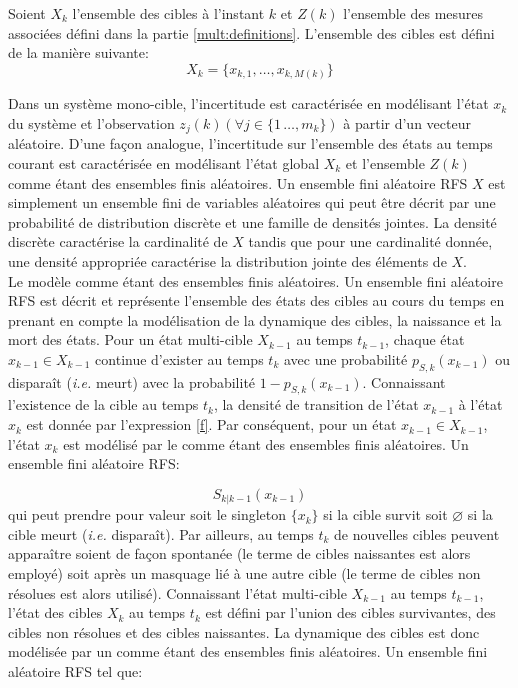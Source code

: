 \documentclass[10pt,french,a4paper]{report}
\begin{document}
Soient $X_k$ l'ensemble des cibles à l'instant $k$ et $Z(k)$ l'ensemble des mesures associées défini dans la partie \ref{mult:definitions}. L'ensemble des cibles est  défini de la manière suivante:  
\begin{equation}
 X_k= \{x_{k,1},\ldots,x_{k,M(k)}\}
\end{equation}


Dans un système mono-cible, l'incertitude est caractérisée en modélisant l'état $x_k$ du système et l'observation $z_j(k)  (\forall j \in \{1\,\ldots,m_k\})$ à partir d'un vecteur aléatoire. D'une façon analogue, l'incertitude sur l'ensemble des états au temps courant est caractérisée en modélisant l'état global $X_k$ et l'ensemble $Z(k)$ comme étant des ensembles finis aléatoires. Un ensemble fini aléatoire \ac{RFS} $X$ est simplement un ensemble fini de variables aléatoires qui peut être décrit par une probabilité de distribution discrète et une famille de densités jointes.  La densité discrète caractérise la cardinalité de $X$ tandis que pour une cardinalité donnée, une densité appropriée caractérise la distribution jointe des éléments de $X$. 
\\

Le modèle comme étant des ensembles finis aléatoires. Un ensemble fini aléatoire \ac{RFS} est décrit et représente l'ensemble des états des cibles au cours du temps en prenant en compte la modélisation de la dynamique des cibles, la naissance et la mort des états. Pour un état multi-cible $X_{k-1}$ au temps $t_{k-1}$, chaque état $x_{k-1} \in  X_{k-1}$ continue d'exister au temps $t_k$ avec une probabilité $p_{S,k}(x_{k-1})$ ou disparaît (\textit{i.e.} meurt) avec la probabilité $1-p_{S,k}(x_{k-1})$. Connaissant l'existence de la cible au temps $t_k$, la densité de transition de l'état $x_{k-1}$ à l'état $x_k$ est donnée par l'expression \ref{f}. Par conséquent, pour un état $x_{k-1} \in X_{k-1}$, l'état $x_{k}$ est modélisé par le comme étant des ensembles finis aléatoires. Un ensemble fini aléatoire \ac{RFS}:

\begin{equation}
S_{k|k-1}(x_{k-1})
\end{equation}
qui peut prendre pour valeur soit le singleton $\{x_{k}\}$ si la cible survit soit $\varnothing$ si la cible meurt (\textit{i.e.} disparaît). Par ailleurs, au temps $t_k$ de nouvelles cibles peuvent apparaître soient de façon spontanée (le terme de cibles naissantes est alors employé) soit après un masquage lié à une autre cible (le terme de cibles non résolues est alors utilisé).  Connaissant l'état multi-cible $X_{k-1}$ au temps $t_{k-1}$, l'état des cibles $X_{k}$ au temps $t_{k}$ est défini par l'union des cibles survivantes, des cibles non résolues et des cibles naissantes. La dynamique des cibles est donc modélisée par un comme étant des ensembles finis aléatoires. Un ensemble fini aléatoire \ac{RFS} tel que:
 
\end{document}
